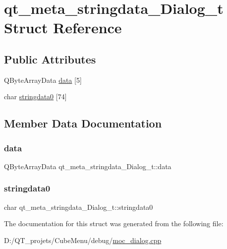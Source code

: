 \hypertarget{structqt__meta__stringdata___dialog__t}{}\section{qt\+\_\+meta\+\_\+stringdata\+\_\+\+Dialog\+\_\+t Struct Reference}
\label{structqt__meta__stringdata___dialog__t}
\subsection*{Public Attributes}
\begin{DoxyCompactItemize}
\item 
Q\+Byte\+Array\+Data \hyperlink{structqt__meta__stringdata___dialog__t_a8d4d74626c71b087b6b991b787f5368e}{data} \mbox{[}5\mbox{]}
\item 
char \hyperlink{structqt__meta__stringdata___dialog__t_af93413df8f81b853970c266cdb3d8869}{stringdata0} \mbox{[}74\mbox{]}
\end{DoxyCompactItemize}


\subsection{Member Data Documentation}
\hypertarget{structqt__meta__stringdata___dialog__t_a8d4d74626c71b087b6b991b787f5368e}{}\label{structqt__meta__stringdata___dialog__t_a8d4d74626c71b087b6b991b787f5368e} 
\subsubsection{\texorpdfstring{data}{data}}
{\footnotesize\ttfamily Q\+Byte\+Array\+Data qt\+\_\+meta\+\_\+stringdata\+\_\+\+Dialog\+\_\+t\+::data}

\hypertarget{structqt__meta__stringdata___dialog__t_af93413df8f81b853970c266cdb3d8869}{}\label{structqt__meta__stringdata___dialog__t_af93413df8f81b853970c266cdb3d8869} 
\subsubsection{\texorpdfstring{stringdata0}{stringdata0}}
{\footnotesize\ttfamily char qt\+\_\+meta\+\_\+stringdata\+\_\+\+Dialog\+\_\+t\+::stringdata0}



The documentation for this struct was generated from the following file\+:\begin{DoxyCompactItemize}
\item 
D\+:/\+Q\+T\+\_\+projets/\+Cube\+Menu/debug/\hyperlink{debug_2moc__dialog_8cpp}{moc\+\_\+dialog.\+cpp}\end{DoxyCompactItemize}
